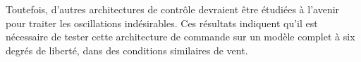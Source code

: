 Toutefois, d'autres architectures de contrôle devraient être étudiées à l'avenir pour traiter les oscillations indésirables. Ces résultats indiquent qu'il est nécessaire de tester cette architecture de commande sur un modèle complet à six degrés de liberté, dans des conditions similaires de vent.






